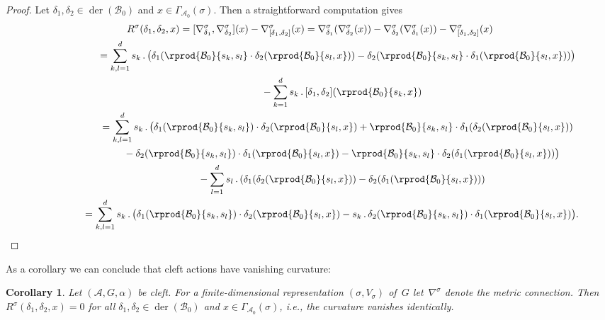 \documentclass[10pt,a4paper]{amsart}
\numberwithin{equation}{section}
\newtheorem{Corollary}[Theorem]{Corollary}
\DeclareMathOperator{\der}{der}
\newcommand*{\acts}{\,.\,}
\newcommand*{\alg}{\mathcal}		%
\newcommand*{\aA}{\alg{A}}			%
\newcommand*{\aB}{\alg{B}} 			%
\begin{document}
\begin{proof}
	Let $\delta_1,\delta_2 \in \der(\aB_0)$ and $x \in \Gamma_{\aA_0}(\sigma)$. Then a straightforward computation gives
	\begin{gather*}
 R^\sigma(\delta_1,\delta_2,x) = [ \nabla_{\delta_1}^\sigma,\nabla_{\delta_2}^\sigma ] (x) - \nabla_{ [\delta_1,\delta_2] }^\sigma (x) = \nabla_{\delta_1}^\sigma ( \nabla_{\delta_2}^\sigma(x) ) - \nabla_{\delta_2}^\sigma ( \nabla_{\delta_1}^\sigma(x) ) - \nabla_{ [\delta_1,\delta_2] }^\sigma (x)
		\\
\hphantom{R^\sigma(\delta_1,\delta_2,x)}{} = \sum_{k,l=1}^d s_k \acts \big( \delta_1 ( \rprod{\aB_0}{s_k,s_l} \cdot \delta_2 ( \rprod{\aB_0}{s_l,x} ) ) - \delta_2 ( \rprod{\aB_0}{s_k,s_l} \cdot \delta_1 ( \rprod{\aB_0}{s_l,x} ) ) \big)
		\\
\hphantom{R^\sigma(\delta_1,\delta_2,x)=}{} - \sum_{k=1}^d s_k \acts [\delta_1,\delta_2] ( \rprod{\aB_0}{s_k,x})
		\\
\hphantom{R^\sigma(\delta_1,\delta_2,x)}{}
 = \sum_{k,l=1}^d s_k \acts \bigl( \delta_1 ( \rprod{\aB_0}{s_k,s_l} ) \cdot \delta_2 ( \rprod{\aB_0}{s_l,x}) + \rprod{\aB_0}{s_k,s_l} \cdot \delta_1( \delta_2 ( \rprod{\aB_0}{s_l,x} ))
		\\			
\hphantom{R^\sigma(\delta_1,\delta_2,x)=}{} - \delta_2 ( \rprod{\aB_0}{s_k,s_l} ) \cdot \delta_1 ( \rprod{\aB_0}{s_l,x} ) - \rprod{\aB_0}{s_k,s_l} \cdot \delta_2 ( \delta_1 ( \rprod{\aB_0}{s_l,x} ) ) \bigr)
		\\
\hphantom{R^\sigma(\delta_1,\delta_2,x)=}{} - \sum_{l=1}^d s_l \acts ( \delta_1 ( \delta_2 ( \rprod{\aB_0}{s_l,x} ) ) - \delta_2 ( \delta_1 ( \rprod{\aB_0}{s_l,x} ) ) )
		\\
 \hphantom{R^\sigma(\delta_1,\delta_2,x)}{}
 = \sum_{k,l=1}^d s_k \acts \bigl( \delta_1 ( \rprod{\aB_0}{s_k,s_l} ) \cdot \delta_2 ( \rprod{\aB_0}{s_l,x} ) - s_k \acts \delta_2 ( \rprod{\aB_0}{s_k,s_l} ) \cdot \delta_1 ( \rprod{\aB_0}{s_l,x} ) \bigr).
		\!\!\!\!\!\tag*{\qed}
	\end{gather*}
	\renewcommand{\qed}{}
\end{proof}

As a corollary we can conclude that cleft actions have vanishing curvature:

\begin{Corollary}\label{cor:cur0}
Let $(\aA,G,\alpha)$ be cleft. For a finite-dimensional representation $(\sigma,V_\sigma)$ of~$G$ let~$\nabla^\sigma$ denote the metric connection. Then $R^\sigma(\delta_1,\delta_2,x) = 0$ for all $\delta_1,\delta_2 \in \der(\aB_0)$ and $x \in \Gamma_{\aA_0}(\sigma)$, i.e., the curvature vanishes identically.
\end{Corollary}
\end{document}
